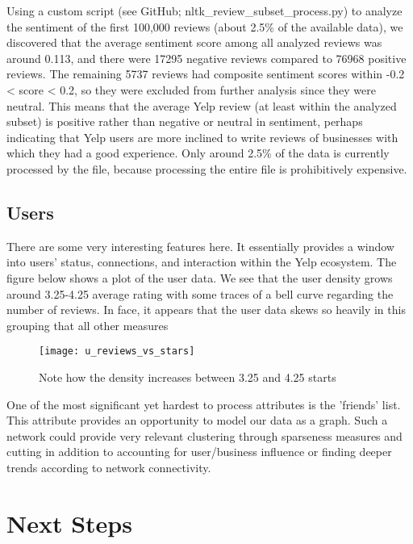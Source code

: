 \quad Using a custom script (see GitHub; nltk\_review\_subset\_process.py) to analyze the sentiment of the first 100,000 reviews (about 2.5\% of the available data), we discovered that the average sentiment score among all analyzed reviews was around 0.113, and there were 17295 negative reviews compared to 76968 positive reviews. The remaining 5737 reviews had composite sentiment scores within -0.2 < score < 0.2, so they were excluded from further analysis since they were neutral. This means that the average Yelp review (at least within the analyzed subset) is positive rather than negative or neutral in sentiment, perhaps indicating that Yelp users are more inclined to write reviews of businesses with which they had a good experience. Only around 2.5\% of the data is currently processed by the file, because processing the entire file is prohibitively expensive.

\subsection{Users}

\quad There are some very interesting features here. It essentially provides a window into users' status, connections, and interaction within the Yelp ecosystem. The figure below shows a plot of the user data. We see that the user density grows around 3.25-4.25 average rating with some traces of a bell curve regarding the number of reviews. In face, it appears that the user data skews so heavily in this grouping that all other measures 

\begin{figure}[!h]
\texttt{[image: u\_reviews\_vs\_stars]}
  \caption{Note how the density increases between 3.25 and 4.25 starts}
  \label{fig:Plot of review count vs average star rating}
\end{figure}

\quad One of the most significant yet hardest to process attributes is the 'friends' list. This attribute provides an opportunity to model our data as a graph. Such a network could provide very relevant clustering through sparseness measures and cutting in addition to accounting for user/business influence or finding deeper trends according to network connectivity.  
\quad
\section{Next Steps}

